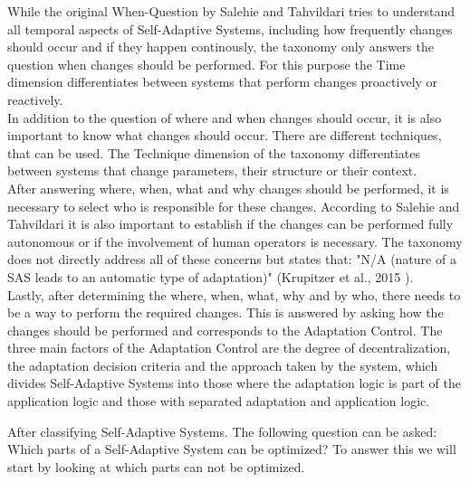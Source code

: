 While the original When-Question by Salehie and Tahvildari tries to understand all temporal aspects of Self-Adaptive Systems,
including how frequently changes should occur and if they happen continously,
the taxonomy only answers the question when changes should be performed.
For this purpose the Time dimension differentiates between systems that perform changes proactively or reactively. \\

In addition to the question of where and when changes should occur, it is also important to know
what changes should occur. There are different techniques, that can be used.
The Technique dimension of the taxonomy differentiates between systems that change parameters, their structure or their context. \\

After answering where, when, what and why changes should be performed, 
it is necessary to select who is responsible for these changes.
According to Salehie and Tahvildari it is also important to establish if the changes can be performed fully autonomous
or if the involvement of human operators is necessary.
The taxonomy does not directly address all of these concerns but states that:
"N/A (nature of a SAS leads to an automatic type of adaptation)" (Krupitzer et al., 2015 \cite{SurveyOnEngineeringApproaches}). \\

Lastly, after determining the where, when, what, why and by who, there needs to be a way
to perform the required changes. This is answered by asking how the changes should be performed
and corresponds to the Adaptation Control.
The three main factors of the Adaptation Control are the degree of decentralization, the adaptation decision criteria
and the approach taken by the system, which divides Self-Adaptive Systems into those where the adaptation logic is part of the application logic
and those with separated adaptation and application logic.


After classifying Self-Adaptive Systems.
The following question can be asked: Which parts of a Self-Adaptive System can be optimized?
To answer this we will start by looking at which parts can not be optimized. %

